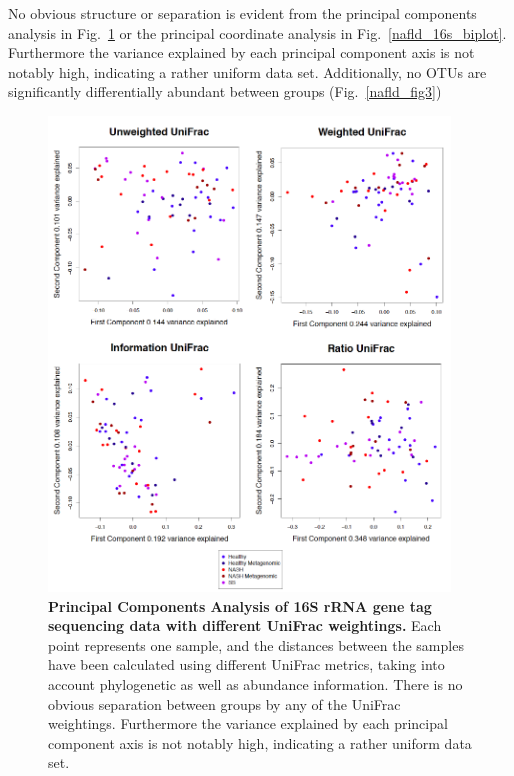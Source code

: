 No obvious structure or separation is evident from the principal components analysis in Fig.~\ref{nafld_fig2} or the principal coordinate analysis in Fig.~\ref{nafld_16s_biplot}. Furthermore the variance explained by each principal component axis is not notably high, indicating a rather uniform data set. Additionally, no OTUs are significantly differentially abundant between groups (Fig.~\ref{nafld_fig3})

\begin{figure}[h]
\begin{center}
\includegraphics[width=0.95\textwidth]{nafld_16s_pcoa.png}
\caption[Principal Components Analysis of 16S rRNA gene tag sequencing data with different UniFrac weightings.]{\textbf{Principal Components Analysis of 16S rRNA gene tag sequencing data with different UniFrac weightings.} Each point represents one sample, and the distances between the samples have been calculated using different UniFrac metrics, taking into account phylogenetic as well as abundance information. There is no obvious separation between groups by any of the UniFrac weightings. Furthermore the variance explained by each principal component axis is not notably high, indicating a rather uniform data set.}
\end{center}
\label{nafld_fig2}
\end{figure}

